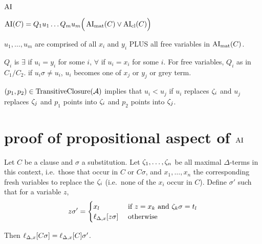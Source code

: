 \documentclass[,%
	paper=a4,%
	DIV12, %
	twoside=false,%
	liststotoc,
	bibtotoc,
	draft=false,%
	numbers=noendperiod
]{scrartcl}
\begin{document}
\subsubsection{$\operatorname{AI}$}


$\operatorname{AI}(C) = Q_1 u_1 \ldots Q_m u_m \Big( \operatorname{AI}_\mathrm{mat}(C) \lor \operatorname{AI}_\mathrm{cl}(C) \Big)$

$u_1, \ldots, u_m$ are comprised of all $x_i$ and $y_i$ PLUS all free variables in $\operatorname{AI}_\mathrm{mat}(C)$.

$Q_i$ is $\exists$ if $u_i = y_i$ for some $i$, $\forall$ if $u_i = x_i$ for some $i$.
For free variables, $Q_i$ as in $C_1/C_2$. if $u_i\sigma \neq u_i$, $u_i$ becomes one of $x_j$ or $y_j$ or grey term.

$(p_1, p_2) \in \operatorname{TransitiveClosure}(\operatorname{\mathcal{A}})$ implies that $u_i < u_j$ if $u_i$ replaces $\zeta_{i}$ and $u_j$ replaces $\zeta_{j}$ and $p_1$ points into $\zeta_{i}$ and $p_2$ points into $\zeta_{j}$.


\clearpage

\section{proof of propositional aspect of $\operatorname{AI}$}

\begin{lemma} 
	\label{lemma:lift_subst_commute}
	Let $C$ be a clause and $\sigma$ a substitution.
	Let $\zeta_{1},\ldots,\zeta_{n}$ be all maximal $\Delta$-terms in this context, i.e.\ those that occur in $C$ or $C\sigma$,  and
	$x_1, \ldots, x_n$ the corresponding fresh variables to replace the $\zeta_{i}$ (i.e.~none of the $x_i$ occur in $C$).
	Define $\sigma'$ such that for a variable $z$,
	\[
		z \sigma' =
		\begin{cases} 
			x_l & \text{ if } z = x_k \text{ and } \zeta_{k}\sigma = t_l  \\
			\ell_{\Delta,x}[z\sigma] & \text{ otherwise}
		\end{cases} 
	\]

	Then
	$\ell_{\Delta,x}[C\sigma] =
	\ell_{\Delta,x}[C]\sigma'$.
\end{lemma}
\end{document}
